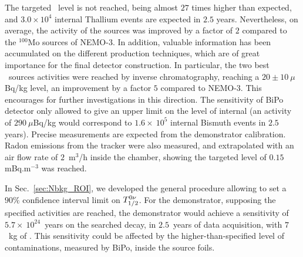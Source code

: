 The targeted \Tl\ level is not reached, being almost $27$ times higher than expected, and $3.0\times 10^{4}$ internal Thallium events are expected in $2.5$ years.
Nevertheless, on average, the activity of the sources was improved by a factor of $2$ compared to the $^{100}$Mo sources of NEMO-$3$.
In addition, valuable information has been accumulated on the different production techniques, which are of great importance for the final detector construction.
In particular, the two best \Tl\ sources activities were reached by inverse chromatography, reaching a $20\pm10~\mu$Bq/kg level, an improvement by a factor $5$ compared to NEMO-$3$.
This encourages for further investigations in this direction.
The sensitivity of BiPo detector only allowed to give an upper limit on the level of internal \Bi(an activity of $290~\mu$Bq/kg would correspond to $1.6\times~10^{5}$ internal Bismuth events in $2.5$ years).
Precise measurements are expected from the demonstrator calibration.
Radon emissions from the tracker were also measured, and extrapolated with an air flow rate of $2$~m$^{3}$/h inside the chamber, showing the targeted level of $0.15$ mBq.m$^{-3}$ was reached.

In Sec.~\ref{sec:Nbkg_ROI}, we developed the general procedure allowing to set a $90\%$ confidence interval limit on $T_{1/2}^{0\nu}$.
For the demonstrator, supposing the specified activities are reached, the demonstrator would achieve a sensitivity of $5.7\times~10^{24}$~years on the searched decay, in $2.5$~years of data acquisition, with $7$~kg of \Se.
This sensitivity could be affected by the higher-than-specified level of contaminations, measured by BiPo, inside the source foils.


